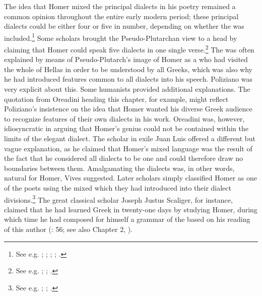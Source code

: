 The idea that Homer mixed the principal dialects in his poetry remained a common opinion throughout the entire early modern period; these principal dialects could be either four or five in number, depending on whether the  was included.\footnote{See e.g. \citet[\textsc{aa.}i\textsc{\textsuperscript{r}}]{Simler1512}; \citet[\textsc{a}.viii\textsc{\textsuperscript{r}}]{Liburnio1546}; \citet[\textsc{xxxiv}]{Lancelot1655}; \citet[20--23]{Grosch1753}; \citet[196]{Ries1786}.} Some scholars brought the Pseudo-Plutarchan view to a head by claiming that Homer could speak five dialects in one single verse.\footnote{See e.g. \citet[\textit{s.v.} “dialecte”]{Furetiere1701}; \citet[\textsc{i.}203, 3rd sequence of pagination]{Chambers1728}; \citet[934]{Dumarsais1754}.} The  was often explained by means of Pseudo-Plutarch’s image of Homer as a  who had visited the whole of Hellas in order to be understood by all Greeks, which was also why he had introduced features common to all dialects into his speech. Poliziano was very explicit about this. Some humanists provided additional explanations. The quotation from Oreadini heading this chapter, for example, might reflect Poliziano’s insistence on the idea that Homer wanted his diverse Greek audience to recognize features of their own dialects in his work. Oreadini was, however, idiosyncratic in arguing that Homer’s genius could not be contained within the limits of the elegant  dialect. The  scholar in exile Juan Luis \citet[\textsc{x}.iiii\textsc{\textsuperscript{r}}]{Vives1533} offered a different but vague explanation, as he claimed that Homer’s mixed language was the result of the fact that he considered all dialects to be one and could therefore draw no boundaries between them. Amalgamating the dialects was, in other words, natural for Homer, Vives suggested. Later scholars simply classified Homer as one of the poets using the mixed  which they had introduced into their dialect divisions.\footnote{See e.g. \citet[6\textsc{\textsuperscript{r}}-6\textsc{\textsuperscript{v}}]{Baile1588}; \citet[333]{Alsted1630}; \citet[161]{Gesner1774}.} The great classical scholar Joseph Justus Scaliger, for instance, claimed that he had learned Greek in twenty-one days by studying Homer, during which time he had composed for himself a grammar of the  based on his reading of this author (\citealt{Scaliger1594}: 56; see also Chapter 2, ).

